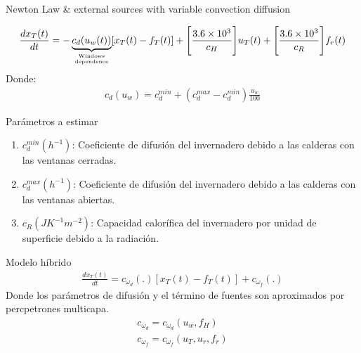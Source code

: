     \begin{model}{Newton Law \& external sources with variable convection diffusion}{}
    
    \begin{gather}
        \frac{dx_{T}(t)}{dt} =  
        -\underbrace{c_d(u_{w}(t))}_{\text{Windows}\atop\text{dependence}}[x_{T}(t) - f_{T}(t)] +
        \Bigg[ \frac{3.6 \times 10^{3}}{c_H} \Bigg] u_{T}(t)+ 
        \Bigg[ \frac{3.6 \times 10^{3}}{ c_R } \Bigg] f_r(t)
    \end{gather}
    Donde:
    \begin{gather}
        c_d(u_w) =  c_d^{min} + (c_d^{max} - c_d^{min})\frac{u_{w}}{100}
    \end{gather}
    
    Parámetros a estimar
    \begin{enumerate}
        \item $c_d^{min}( h^{-1})$: Coeficiente de difusión del invernadero debido a las calderas con las ventanas cerradas.
        \item $c_d^{max}( h^{-1})$: Coeficiente de difusión del invernadero debido a las calderas con las ventanas abiertas. 
        \item $c_R(JK^{-1}m^{-2})$: Capacidad calorífica del invernadero por unidad de superficie debido a la radiación.
    \end{enumerate}
    \end{model}
    
    \begin{model}{Modelo híbrido}{}
    \begin{gather}
        \frac{dx_{T}(t)}{dt} = c_{\omega_d}(.)[x_{T}(t) - f_{T}(t)] + c_{\omega_f}(.) 
    \end{gather}
    Donde los parámetros de difusión y el término de fuentes son aproximados por percpetrones multicapa.
    \begin{gather}
        c_{\omega_d} = c_{\omega_d}(u_w,f_H) \\
        c_{\omega_f} =  c_{\omega_f}(u_T,u_r,f_r)
    \end{gather}
    \end{model}
    
